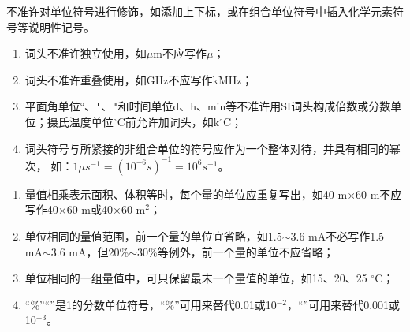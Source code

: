 %
\noindent 不准许对单位符号进行修饰，如添加上下标，或在组合单位符号中插入化学元素符号等说明性记号。
\begin{enumerate}
\item 词头不准许独立使用，如$\mu$m不应写作$\mu$；
\item 词头不准许重叠使用，如GHz不应写作kMHz；
\item 平面角单位°、\verb|'|、\verb|"|和时间单位d、h、min等不准许用SI词头构成倍数或分数单位；摄氏温度单位$^\circ$C前允许加词头，如k$^\circ$C；
\item 词头符号与所紧接的非组合单位的符号应作为一个整体对待，并具有相同的幂次，
如：$1\mu s^{-1}=(10^{-6}s)^{-1}=10^6s^{-1}$。
\end{enumerate}
\begin{enumerate}
\item 量值相乘表示面积、体积等时，每个量的单位应重复写出，如40 m$\times$60 m不应写作40$\times$60 m或40$\times$60 m$^{2}$；
\item 单位相同的量值范围，前一个量的单位宜省略，如1.5$\sim$3.6 mA不必写作1.5 mA$\sim$3.6 mA，但20\%$\sim$30\%等例外，前一个量的单位不应省略；
\item 单位相同的一组量值中，可只保留最末一个量值的单位，如15、20、25 $^\circ$C；
\item “\%”“\textperthousand ”是1的分数单位符号，“\%”可用来替代0.01或10$^{-2}$，“\textperthousand ”可用来替代0.001或10$^{-3}$。
\end{enumerate}
\SubSectionEnd
